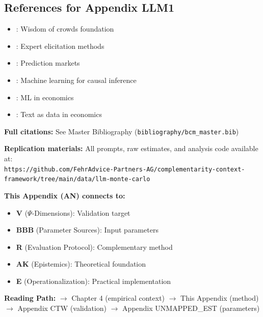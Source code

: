 
\subsection{References for Appendix LLM1}
\label{sec:AN-references}

\begin{itemize}[nosep]
    \item \citet{surowiecki2005wisdom}: Wisdom of crowds foundation
    \item \citet{ohaganelicitation}: Expert elicitation methods
    \item \citet{wolfers2004prediction}: Prediction markets
    \item \citet{atheyimbens2019}: Machine learning for causal inference
    \item \citet{mullainathan2017}: ML in economics
    \item \citet{gentzkow2019}: Text as data in economics
\end{itemize}

\textbf{Full citations:} See Master Bibliography (\texttt{bibliography/bcm\_master.bib})

\textbf{Replication materials:} All prompts, raw estimates, and analysis code available at:\\
\texttt{https://github.com/FehrAdvice-Partners-AG/complementarity-context-framework/tree/main/data/llm-monte-carlo}


\begin{tcolorbox}[colback=gray!10!white, colframe=gray!75!black,
    title=\textbf{Cross-Reference Footer}]
\label{sec:AN-footer}

\textbf{This Appendix (AN) connects to:}
\begin{itemize}[nosep]
    \item \textbf{V} ($\Psi$-Dimensions): Validation target
    \item \textbf{BBB} (Parameter Sources): Input parameters
    \item \textbf{R} (Evaluation Protocol): Complementary method
    \item \textbf{AK} (Epistemics): Theoretical foundation
    \item \textbf{E} (Operationalization): Practical implementation
\end{itemize}

\textbf{Reading Path:}
$\rightarrow$ Chapter 4 (empirical context) $\rightarrow$ This Appendix (method)
$\rightarrow$ Appendix CTW (validation) $\rightarrow$ Appendix UNMAPPED_EST (parameters)

\end{tcolorbox}

